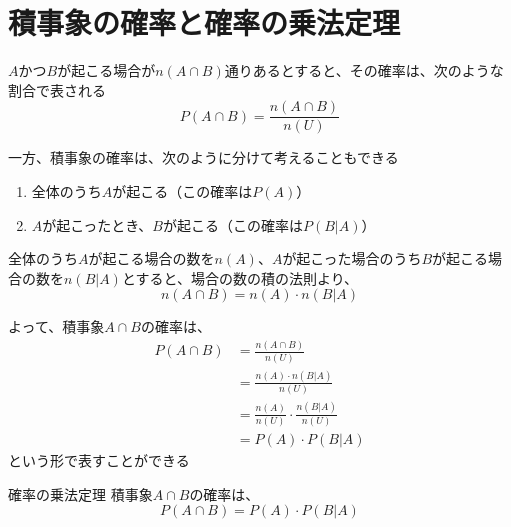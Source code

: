 \documentclass[../../../topic_probability-statistics]{subfiles}
\begin{document}
\sectionline
\section{積事象の確率と確率の乗法定理}

$A$かつ$B$が起こる場合が$n(A \cap B)$通りあるとすると、その確率は、次のような割合で表される
\begin{equation*}
  P(A \cap B) = \frac{n(A \cap B)}{n(U)}
\end{equation*}

\br

一方、積事象の確率は、次のように分けて考えることもできる

\begin{enumerate}
  \item 全体のうち$A$が起こる（この確率は$P(A)$）
  \item $A$が起こったとき、$B$が起こる（この確率は$P(B|A)$）
\end{enumerate}

全体のうち$A$が起こる場合の数を$n(A)$、$A$が起こった場合のうち$B$が起こる場合の数を$n(B|A)$とすると、場合の数の積の法則より、
\begin{equation*}
  n(A \cap B) = n(A) \cdot n(B|A)
\end{equation*}

よって、積事象$A \cap B$の確率は、
\begin{align*}
  P(A \cap B) & = \frac{n(A \cap B)}{n(U)}                    \\
              & = \frac{n(A) \cdot n(B|A)}{n(U)}              \\
              & = \frac{n(A)}{n(U)} \cdot \frac{n(B|A)}{n(U)} \\
              & = P(A) \cdot P(B|A)
\end{align*}
という形で表すことができる

\begin{theorem}{確率の乗法定理}
  積事象$A \cap B$の確率は、
  \begin{equation*}
    P(A \cap B) = P(A) \cdot P(B|A)
  \end{equation*}
\end{theorem}
\end{document}
